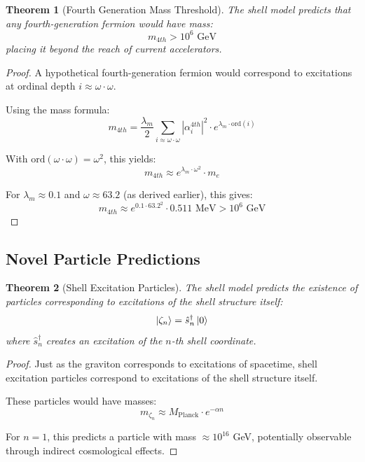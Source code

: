 \documentclass[12pt,a4paper]{article}
\newtheorem{theorem}{Theorem}[section]
\newcommand{\ord}{\text{ord}}
\begin{document}
\begin{theorem}[Fourth Generation Mass Threshold]
\label{thm:fourth-generation}
The shell model predicts that any fourth-generation fermion would have mass:
\begin{equation}
m_{4th} > 10^6 \text{ GeV}
\end{equation}
placing it beyond the reach of current accelerators.
\end{theorem}

\begin{proof}
A hypothetical fourth-generation fermion would correspond to excitations at ordinal depth $i \approx \omega \cdot \omega$.

Using the mass formula:
\begin{equation}
m_{4th} = \frac{\lambda_m}{2} \sum_{i \approx \omega \cdot \omega} |\alpha_{i}^{4th}|^2 \cdot e^{\lambda_m \cdot \ord(i)}
\end{equation}

With $\ord(\omega \cdot \omega) = \omega^2$, this yields:
\begin{equation}
m_{4th} \approx e^{\lambda_m \cdot \omega^2} \cdot m_e
\end{equation}

For $\lambda_m \approx 0.1$ and $\omega \approx 63.2$ (as derived earlier), this gives:
\begin{equation}
m_{4th} \approx e^{0.1 \cdot 63.2^2} \cdot 0.511 \text{ MeV} > 10^6 \text{ GeV}
\end{equation}
\end{proof}

\subsection{Novel Particle Predictions}
\label{subsec:novel-particles}

\begin{theorem}[Shell Excitation Particles]
\label{thm:shell-particles}
The shell model predicts the existence of particles corresponding to excitations of the shell structure itself:
\begin{equation}
\ket{\zeta_n} = \hat{s}_n^{\dagger} \ket{0}
\end{equation}
where $\hat{s}_n^{\dagger}$ creates an excitation of the $n$-th shell coordinate.
\end{theorem}

\begin{proof}
Just as the graviton corresponds to excitations of spacetime, shell excitation particles correspond to excitations of the shell structure itself.

These particles would have masses:
\begin{equation}
m_{\zeta_n} \approx M_{\text{Planck}} \cdot e^{-\alpha n}
\end{equation}

For $n = 1$, this predicts a particle with mass $\approx 10^{16}$ GeV, potentially observable through indirect cosmological effects.
\end{proof}
\end{document}
